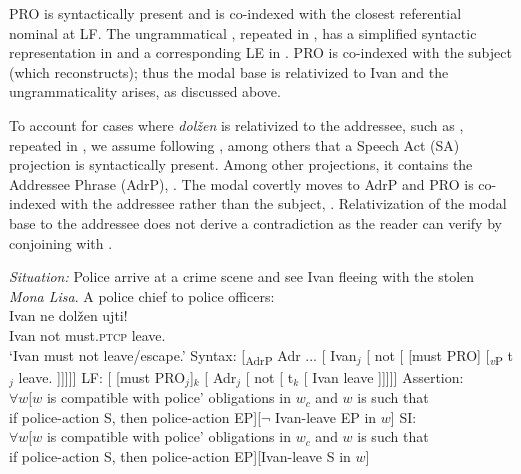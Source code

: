 \documentclass[output=paper,
modfonts,
newtxmath,colorlinks,citecolor=brown
]{langscibook}
\begin{document}
\noindent PRO is syntactically present and is co-indexed with the closest referential nominal at LF. The ungrammatical , repeated in , has a simplified syntactic representation in  and a corresponding LE in . PRO is co-indexed with the subject (which reconstructs); thus the modal base  is relativized to Ivan and the ungrammaticality arises, as discussed above. 

\ea {}
    \z \z 

\noindent To account for cases where \textit{dolžen} is relativized to the addressee, such as , repeated in , we assume following \citet{speten03}, among others that a Speech Act (SA) projection is syntactically present. Among other projections, it contains the Addressee Phrase (AdrP), . The modal covertly moves to AdrP and PRO is co-indexed with the addressee rather than the subject, . Relativization of the modal base to the addressee does not derive a contradiction as the reader can verify by conjoining  with . 

\ea \label{obvgen} \ea \label{obv} \textit{Situation:} Police arrive at a crime scene and see Ivan fleeing with the stolen \emph{Mona Lisa}. A police chief to police officers:\\[5pt]
	{\gll  Ivan ne dolžen ujti!\\
	Ivan  not must.\textsc{ptcp} leave.\p \\
	\glt `Ivan must not leave/escape.'}
	\ex Syntax:  [\textsubscript{AdrP} Adr ... [ Ivan$_j$  [ not [ [must PRO]  [\textsubscript{\textit{v}P} t$_j$ {leave.\p} ]]]]] \label{obvsyn}
	\ex LF:  [ [must PRO$_j$]$_k$ [ Adr$_j$ [ not [ t$_k$ [ Ivan leave  ]]]]] \label{obvlf}
         \ex Assertion: \\
    $\forall w$[$w$ is compatible with police' obligations in $w_c$ and $w$ is such that \\
    if police-action S, then police-action EP][$\neg$ Ivan-leave EP in $w$] \label{assertobv}
    \ex SI: \\
    $\forall w$[$w$ is compatible with police' obligations in $w_c$ and $w$ is such that \\
    if police-action S, then police-action EP][Ivan-leave S in $w$] \label{siobv}
    \z \z 
        
\end{document}
